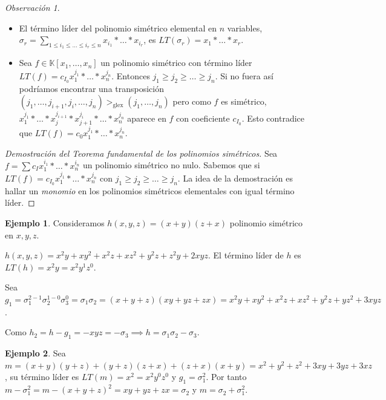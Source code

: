 \documentclass[10pt, spanish]{report}
\theoremstyle{definition}
\newtheorem*{ej}{Ejemplo}
\theoremstyle{custom}
\theoremstyle{remark}
\newtheorem*{obs}{Observación}
\newcommand{\K}{\mathbb{K}}
\renewcommand{\geq}{\geqslant}
\renewcommand{\leq}{\leqslant}
\newcommand{\fecha}[1]{\marginpar{\underline{\footnotesize{#1}}}}
\begin{document}
\begin{obs}
    \hspace{0pt}
    \begin{itemize}
        \item El término líder del polinomio simétrico elemental en $n$ variables,
            $\sigma_r=\sum_{1\leq i_1\leq \ldots\leq i_r \leq n}
            x_{i_1}*\ldots*x_{i_r}$, es $LT(\sigma_r)=x_1*\ldots*x_r$.
        \item Sea $f\in\K[x_1,\ldots,x_n]$ un polinomio simétrico con término líder
            $LT(f)=c_{I_0}x_1^{j_1}*\ldots*x_n^{j_n}$. Entonces $j_1\geq j_2 \geq
            \ldots\geq j_n$. Si no fuera así podríamos encontrar una
            transposición
            $(j_1,\ldots,j_{i+1},j_i,\ldots,j_n)>_{\text{glex}}(j_1,\ldots,j_n)$
            pero como $f$ es simétrico,
            $x_1^{j_1}*\ldots*x_j^{j_{i+1}}*x_{j+1}^{j_i}*\ldots*x_n^{j_n}$
            aparece en $f$ con coeficiente $c_{I_0}$. Esto contradice que
            $LT(f)=c_0x_1^{j_1}*\ldots*x_{n}^{j_n}$.  
    \end{itemize}
\end{obs}

\begin{proof}[Demostración del Teorema fundamental de los polinomios simétricos]
    Sea $f=\sum c_I x_1^{i_1}*\ldots*x_n^{i_n}$ un polinomio simétrico no nulo.
    Sabemos que si $LT(f)=c_{I_0}x_1^{j_1}*\ldots*x_n^{j_n}$ con $j_1\geq j_2
    \geq \ldots \geq j_n$. La idea de la demostración es hallar un
    \textit{monomio} en los polinomios simétricos elementales con igual término
    líder.
    
\end{proof}

\fecha{14/04}
\begin{ej}
    Consideramos $h(x,y,z) = (x+y)(z+x)$ polinomio simétrico en $x,y,z$.

    $h(x,y,z)=x^2y+xy^2+x^2z+xz^2+y^2z+z^2y+ 2xyz$.
    El término líder de $h$ es $LT(h)=x^2y=x^2y^1z^0$.

    Sea $g_1=\sigma_1^{2-1}\sigma_2^{1-0}\sigma_3^{0}=\sigma_1\sigma_2=
    (x+y+z)(xy+yz+zx)=x^2y+xy^2+x^2z+xz^2+y^2z+yz^2+3xyz$.

    Como $h_2=h-g_1=-xyz=-\sigma_3 \implies h= \sigma_1\sigma_2-\sigma_3$.
\end{ej}

\begin{ej}
    Sea $m=(x+y)(y+z)+(y+z)(z+x)+(z+x)(x+y)=x^2+y^2+z^2+3xy+3yz+3xz$, su término
    líder es $LT(m)=x^2=x^2y^0z^0$ y $g_1=\sigma_1^2$. Por tanto
    $m-\sigma_1^2=m-(x+y+z)^2=xy+yz+zx=\sigma_2$ y $m=\sigma_2+\sigma_1^2$.    
\end{ej}
\end{document}
